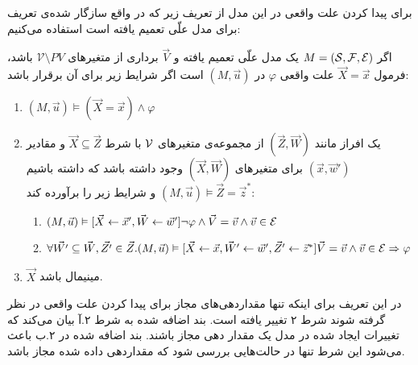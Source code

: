 برای پیدا کردن علت واقعی در این مدل از تعریف زیر که در واقع سازگار شده‌ی تعریف
برای مدل‌ علّی تعمیم یافته است استفاده می‌کنیم:

\begin{definition}
    \label{def:extended}
    اگر
    $M = (\mathcal{S},\mathcal{F},\mathcal{E})$
    یک مدل علّی تعمیم یافته و
    $\vec V$
    برداری از متغیر‌های
    $\mathcal{V} \setminus PV$
    باشد،
    فرمول
    $\vec X = \vec x$
    علت واقعی
    $\varphi$
    در
    $(M,\vec{u})$
    است
    اگر شرایط زیر برای آن برقرار باشد:
    \begin{enumerate}
        \item $(M,\vec{u}) \vDash (\vec{X} = \vec{x}) \wedge \varphi$
        \item یک افراز مانند
              $(\vec{Z},\vec{W})$
              از مجموعه‌ی متغیر‌های
              $\mathcal{V}$
              با شرط
              $\vec{X} \subseteq \vec{Z}$
              و مقادیر
              $(\vec{x},\vec{w}')$
              برای متغیر‌های
              $(\vec{X},\vec{W})$
              وجود داشته باشد که داشته باشیم
              $(M,\vec{u})\vDash \vec{Z} = \vec{z}^*$
              و شرایط زیر را برآورده کند:
              \begin{enumerate}
                  \item $(M,\vec u)\vDash
                  [\vec{X}\leftarrow\vec{x}',\vec{W}\leftarrow\vec{w}'] 
                  \neg \varphi \wedge \vec V = \vec v 
                  \wedge \vec v \in \mathcal{E}$
                  \item $\forall \vec{W'} \subseteq \vec{W},\vec{Z'}\in \vec{Z}.
                            (M,\vec{u})\vDash [\vec X\leftarrow\vec x,\vec{W}'\leftarrow \vec{w}',\vec{Z}'\leftarrow \vec{z}^*]
                            \vec V = \vec v \wedge \vec v \in \mathcal{E}
                            \Rightarrow \varphi$
              \end{enumerate}
        \item $\vec X$
              مینیمال باشد.
    \end{enumerate}
\end{definition}
در این تعریف برای اینکه تنها مقداردهی‌های مجاز برای پیدا کردن علت واقعی در نظر گرفته شوند شرط ۲ تغییر یافته است.
بند اضافه شده به شرط ۲.آ بیان می‌کند که تغییرات ایجاد شده در مدل یک مقدار دهی مجاز باشند.
بند اضافه شده در ۲.ب باعث می‌شود این شرط تنها در حالت‌هایی بررسی شود که مقداردهی داده شده مجاز باشد.
